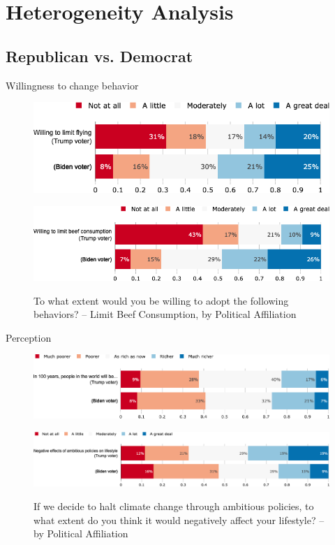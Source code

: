 \documentclass[aspectratio=169,9pt,dvipsnames]{beamer}
\begin{document}
\section{Heterogeneity Analysis}

\subsection{Republican vs. Democrat}
\begin{frame}{Willingness to change behavior}%
\vspace{-.2cm}
\begin{figure}[h!]
\caption{To what extent would you be willing to adopt the following behaviors? -– Limit Flying, by Political Affiliation}
\includegraphics[width=.6\textwidth]{../figures/US/willing_limit_flying_US_pol.png} \\
\vspace{.5cm}
\caption{To what extent would you be willing to adopt the following behaviors? -- Limit Beef Consumption, by Political Affiliation}
\includegraphics[width=.7\textwidth]{../figures/US/willing_limit_beef_US_pol.png} \\
\end{figure}
\end{frame}

\begin{frame}{Perception}%
\vspace{-.5cm}
\begin{figure}[h!]
\caption{Do you think that overall people in the world will be richer or poorer in 100 years from now? -– by Political Affiliation}
\includegraphics[width=.7\textwidth]{../figures/US/future_richness_US_pol.png} \\
\vspace{.5cm}
\caption{If we decide to halt climate change through ambitious policies, to what extent do you think it would negatively affect your lifestyle? -- by Political Affiliation}
\includegraphics[width=.7\textwidth]{../figures/US/effect_halt_CC_lifestyle_US_pol.png} \\
\end{figure}
\end{frame}
\end{document}
